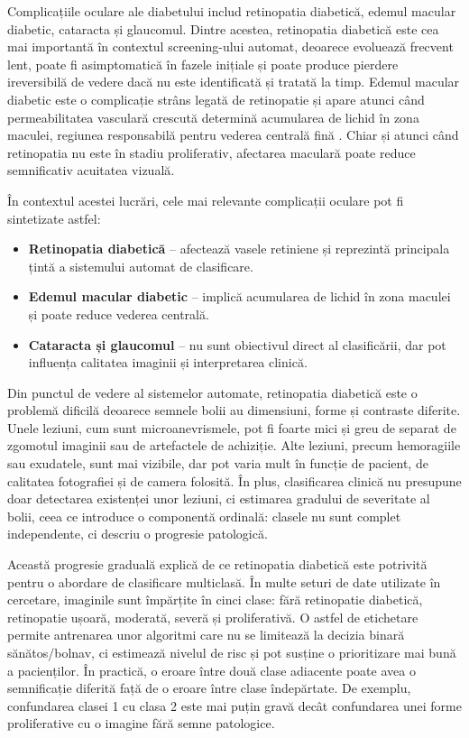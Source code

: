 \documentclass[12pt, a4paper, oneside, romanian]{teza-upb}
\begin{document}
Complicațiile oculare ale diabetului includ retinopatia diabetică, edemul macular diabetic, cataracta și glaucomul. Dintre acestea, retinopatia diabetică este cea mai importantă în contextul screening-ului automat, deoarece evoluează frecvent lent, poate fi asimptomatică în fazele inițiale și poate produce pierdere ireversibilă de vedere dacă nu este identificată și tratată la timp. Edemul macular diabetic este o complicație strâns legată de retinopatie și apare atunci când permeabilitatea vasculară crescută determină acumularea de lichid în zona maculei, regiunea responsabilă pentru vederea centrală fină \cite{18_wong2016diabetic}. Chiar și atunci când retinopatia nu este în stadiu proliferativ, afectarea maculară poate reduce semnificativ acuitatea vizuală.
\bigskip

În contextul acestei lucrări, cele mai relevante complicații oculare pot fi sintetizate astfel:

\begin{itemize}
  \item \textbf{Retinopatia diabetică} -- afectează vasele retiniene și reprezintă principala țintă a sistemului automat de clasificare.
  \item \textbf{Edemul macular diabetic} -- implică acumularea de lichid în zona maculei și poate reduce vederea centrală.
  \item \textbf{Cataracta și glaucomul} -- nu sunt obiectivul direct al clasificării, dar pot influența calitatea imaginii și interpretarea clinică.
\end{itemize}

\bigskip

Din punctul de vedere al sistemelor automate, retinopatia diabetică este o problemă dificilă deoarece semnele bolii au dimensiuni, forme și contraste diferite. Unele leziuni, cum sunt microanevrismele, pot fi foarte mici și greu de separat de zgomotul imaginii sau de artefactele de achiziție. Alte leziuni, precum hemoragiile sau exudatele, sunt mai vizibile, dar pot varia mult în funcție de pacient, de calitatea fotografiei și de camera folosită. În plus, clasificarea clinică nu presupune doar detectarea existenței unor leziuni, ci estimarea gradului de severitate al bolii, ceea ce introduce o componentă ordinală: clasele nu sunt complet independente, ci descriu o progresie patologică.
\bigskip

Această progresie graduală explică de ce retinopatia diabetică este potrivită pentru o abordare de clasificare multiclasă. În multe seturi de date utilizate în cercetare, imaginile sunt împărțite în cinci clase: fără retinopatie diabetică, retinopatie ușoară, moderată, severă și proliferativă. O astfel de etichetare permite antrenarea unor algoritmi care nu se limitează la decizia binară sănătos/bolnav, ci estimează nivelul de risc și pot susține o prioritizare mai bună a pacienților. În practică, o eroare între două clase adiacente poate avea o semnificație diferită față de o eroare între clase îndepărtate. De exemplu, confundarea clasei 1 cu clasa 2 este mai puțin gravă decât confundarea unei forme proliferative cu o imagine fără semne patologice.
\end{document}
